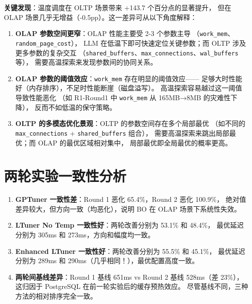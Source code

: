 \textbf{关键发现}：温度调度在 OLTP 场景带来 +143.7 个百分点的显著提升，
但在 OLAP 场景几乎无增益（-0.5pp）。这一差异可从以下角度解释：

\begin{enumerate}
  \item \textbf{OLAP 参数空间更窄}：OLAP 性能主要受 2-3 个参数主导
       （\texttt{work\_mem}、\texttt{random\_page\_cost}），
        LLM 在低温下即可快速定位关键参数；而 OLTP 涉及更多参数的复杂交互
       （\texttt{shared\_buffers}、\texttt{max\_connections}、\texttt{wal\_buffers} 等），
        需要高温探索来发现参数间的协同关系。

  \item \textbf{OLAP 参数的阈值效应}：\texttt{work\_mem} 存在明显的阈值效应——
        足够大时性能好（内存排序），不足时性能断崖（磁盘溢写）。
        高温探索容易越过这一阈值导致性能恶化
       （如 R1-Round1 中 \texttt{work\_mem} 从 165MB→8MB 的灾难性下降），
        反而不如低温的保守策略。

  \item \textbf{OLTP 的多模态优化景观}：OLTP 的参数空间存在多个局部最优
       （如不同的 \texttt{max\_connections} + \texttt{shared\_buffers} 组合），
        需要高温探索来跳出局部最优；而 OLAP 的最优区域相对集中，
        局部最优即全局最优的概率更高。
\end{enumerate}



\section{两轮实验一致性分析}

\begin{enumerate}
  \item \textbf{GPTuner 一致性差}：Round 1 恶化 65.4\%，Round 2 恶化 100.9\%，
        绝对值差异较大，但方向一致（均恶化），说明 BO 在 OLAP 场景下系统性失效。
  \item \textbf{LTuner No Temp 一致性好}：两轮改善分别为 53.1\% 和 48.4\%，
        最优延迟分别为 305ms 和 273ms，方向和幅度均一致。
  \item \textbf{Enhanced LTuner 一致性好}：两轮改善分别为 55.5\% 和 45.1\%，
        最优延迟分别为 289ms 和 290ms（几乎相同！），最优配置高度一致。
  \item \textbf{两轮间基线差异}：Round 1 基线 651ms vs Round 2 基线 528ms（差 23\%），
        这归因于 PostgreSQL 在前一轮实验后的缓存预热效应。
        尽管基线不同，三种方法的相对排序完全一致。
\end{enumerate}


